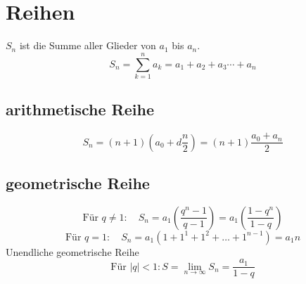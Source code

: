 \section{Reihen}
$S_n$ ist die Summe aller Glieder von $a_1$ bis $a_n$. 
\[ \boxed{S_n = \sum_{k=1}^{n} a_k = a_1 + a_2 + a_3 \cdots + a_n} \]

\subsection{arithmetische Reihe}
\[ \boxed{S_n = \left(n + 1\right)\left(a_0 + d \frac{n}{2}\right) = \left(n + 1\right) \frac{a_0 + a_n}{2}} \]

\subsection{geometrische Reihe}
\[ \boxed{\text{Für } q \neq 1: \quad S_n = a_1 \left(  \frac{q^n - 1}{q - 1} \right) = a_1 \left(  \frac{1 - q^n}{1 - q} \right)} \]
\[ \boxed{\text{Für } q = 1: \quad S_n = a_1 \left(1+1^1 + 1^2 + \ldots + 1^{n-1}\right) = a_1 n} \]
Unendliche geometrische Reihe
\[ \boxed{\text{Für } |q| < 1: S = \lim_{n \rightarrow \infty} S_n = \frac{a_1}{1 - q}} \]
